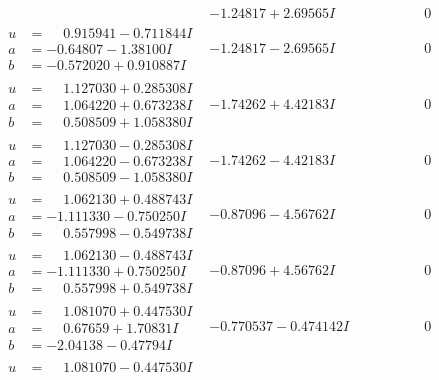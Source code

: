 \documentclass[1p]{elsarticle_modified}
\theoremstyle{definition}
\begin{document}
$$\begin{array}{c|c|c}
 & -1.24817 + 2.69565 I & \phantom{-0.000000 } 0 \\ \hline\begin{aligned}
u &= \phantom{-}0.915941 - 0.711844 I \\
a &= -0.64807 - 1.38100 I \\
b &= -0.572020 + 0.910887 I\end{aligned}
 & -1.24817 - 2.69565 I & \phantom{-0.000000 } 0 \\ \hline\begin{aligned}
u &= \phantom{-}1.127030 + 0.285308 I \\
a &= \phantom{-}1.064220 + 0.673238 I \\
b &= \phantom{-}0.508509 + 1.058380 I\end{aligned}
 & -1.74262 + 4.42183 I & \phantom{-0.000000 } 0 \\ \hline\begin{aligned}
u &= \phantom{-}1.127030 - 0.285308 I \\
a &= \phantom{-}1.064220 - 0.673238 I \\
b &= \phantom{-}0.508509 - 1.058380 I\end{aligned}
 & -1.74262 - 4.42183 I & \phantom{-0.000000 } 0 \\ \hline\begin{aligned}
u &= \phantom{-}1.062130 + 0.488743 I \\
a &= -1.111330 - 0.750250 I \\
b &= \phantom{-}0.557998 - 0.549738 I\end{aligned}
 & -0.87096 - 4.56762 I & \phantom{-0.000000 } 0 \\ \hline\begin{aligned}
u &= \phantom{-}1.062130 - 0.488743 I \\
a &= -1.111330 + 0.750250 I \\
b &= \phantom{-}0.557998 + 0.549738 I\end{aligned}
 & -0.87096 + 4.56762 I & \phantom{-0.000000 } 0 \\ \hline\begin{aligned}
u &= \phantom{-}1.081070 + 0.447530 I \\
a &= \phantom{-}0.67659 + 1.70831 I \\
b &= -2.04138 - 0.47794 I\end{aligned}
 & -0.770537 - 0.474142 I & \phantom{-0.000000 } 0 \\ \hline\begin{aligned}
u &= \phantom{-}1.081070 - 0.447530 I \\

\end{aligned}
\end{array}$$
\end{document}
